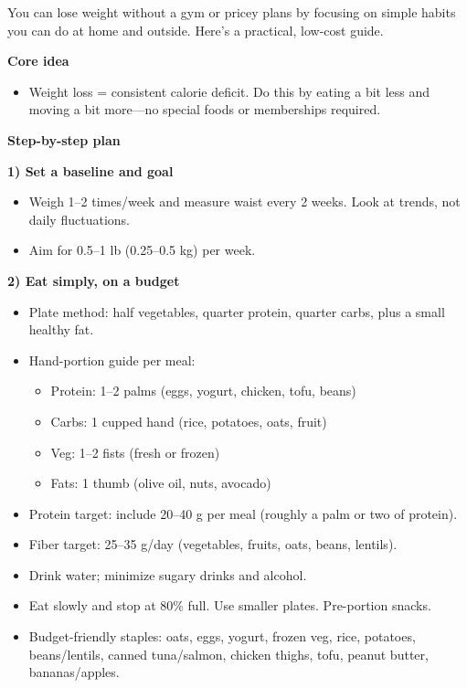 \begin{responsebox}
You can lose weight without a gym or pricey plans by focusing on simple habits you can do at home and outside. Here’s a practical, low-cost guide.

\textbf{Core idea}
\begin{itemize}[noitemsep, topsep=0pt]
    \item Weight loss = consistent calorie deficit. Do this by eating a bit less and moving a bit more—no special foods or memberships required.
\end{itemize}

\textbf{Step-by-step plan}

\textbf{1) Set a baseline and goal}
\begin{itemize}[noitemsep, topsep=0pt]
    \item Weigh 1–2 times/week and measure waist every 2 weeks. Look at trends, not daily fluctuations.
    \item Aim for 0.5–1 lb (0.25–0.5 kg) per week.
\end{itemize}

\textbf{2) Eat simply, on a budget}
\begin{itemize}[noitemsep, topsep=0pt]
    \item Plate method: half vegetables, quarter protein, quarter carbs, plus a small healthy fat.
    \item Hand-portion guide per meal:
    \begin{itemize}[noitemsep]
        \item Protein: 1–2 palms (eggs, yogurt, chicken, tofu, beans)
        \item Carbs: 1 cupped hand (rice, potatoes, oats, fruit)
        \item Veg: 1–2 fists (fresh or frozen)
        \item Fats: 1 thumb (olive oil, nuts, avocado)
    \end{itemize}
    \item Protein target: include 20–40 g per meal (roughly a palm or two of protein).
    \item Fiber target: 25–35 g/day (vegetables, fruits, oats, beans, lentils).
    \item Drink water; minimize sugary drinks and alcohol.
    \item Eat slowly and stop at 80\% full. Use smaller plates. Pre-portion snacks.
    \item Budget-friendly staples: oats, eggs, yogurt, frozen veg, rice, potatoes, beans/lentils, canned tuna/salmon, chicken thighs, tofu, peanut butter, bananas/apples.
\end{itemize}


\end{responsebox}
